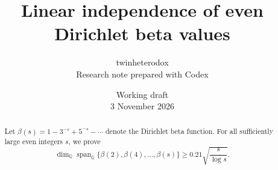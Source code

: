 \documentclass[11pt]{article}
\title{Linear independence of even Dirichlet beta values}
\author{twinheterodox\\[2pt]\normalsize Research note prepared with Codex}
\date{\small Working draft\\3 November 2026}
\theoremstyle{remark}
\numberwithin{equation}{section}
\DeclareMathOperator{\Span}{span}
\newcommand{\Q}{\mathbb Q}
\begin{document}
\maketitle
\begin{abstract}
Let $\beta(s)=1-3^{-s}+5^{-s}-\cdots$ denote the Dirichlet beta function.
For all sufficiently large even integers $s$, we prove
\[
 \dim_{\Q}\Span_{\Q}\{\beta(2),\beta(4),\ldots,\beta(s)\}
 \geq 0.21\sqrt{\frac{s}{\log s}}.
\]
\end{abstract}








\end{document}
